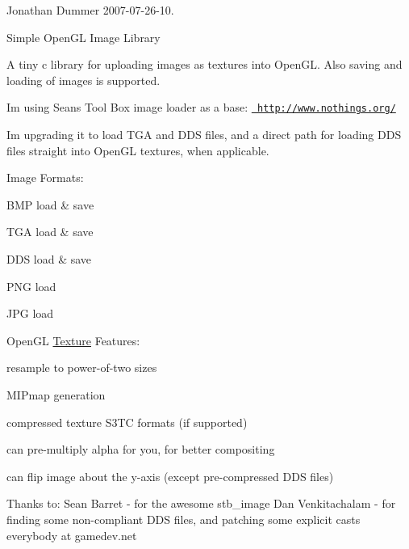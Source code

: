 Jonathan Dummer 2007-\/07-\/26-\/10.

Simple Open\+GL Image Library

A tiny c library for uploading images as textures into Open\+GL. Also saving and loading of images is supported.

I\textquotesingle{}m using Sean\textquotesingle{}s Tool Box image loader as a base\+: \href{http://www.nothings.org/}{\texttt{ http\+://www.\+nothings.\+org/}}

I\textquotesingle{}m upgrading it to load TGA and DDS files, and a direct path for loading DDS files straight into Open\+GL textures, when applicable.

Image Formats\+:
\begin{DoxyItemize}
\item BMP load \& save
\item TGA load \& save
\item DDS load \& save
\item PNG load
\item JPG load
\end{DoxyItemize}

Open\+GL \mbox{\hyperlink{class_texture}{Texture}} Features\+:
\begin{DoxyItemize}
\item resample to power-\/of-\/two sizes
\item MIPmap generation
\item compressed texture S3\+TC formats (if supported)
\item can pre-\/multiply alpha for you, for better compositing
\item can flip image about the y-\/axis (except pre-\/compressed DDS files)
\end{DoxyItemize}

Thanks to\+: Sean Barret -\/ for the awesome stb\+\_\+image Dan Venkitachalam -\/ for finding some non-\/compliant DDS files, and patching some explicit casts everybody at gamedev.\+net 